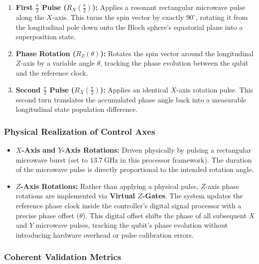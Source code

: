 \documentclass[
]{article}
\providecommand{\tightlist}{%
  \setlength{\itemsep}{0pt}\setlength{\parskip}{0pt}}
\begin{document}
\begin{enumerate}
\def\labelenumi{\arabic{enumi}.}
\tightlist
\item
  \textbf{First \(\frac{\pi}{2}\) Pulse (\(R_X(\frac{\pi}{2})\)):}
  Applies a resonant rectangular microwave pulse along the \(X\)-axis.
  This turns the spin vector by exactly \(90^\circ\), rotating it from
  the longitudinal pole down onto the Bloch sphere's equatorial plane
  into a superposition state.
\item
  \textbf{Phase Rotation (\(R_Z(\theta)\)):} Rotates the spin vector
  around the longitudinal \(Z\)-axis by a variable angle \(\theta\),
  tracking the phase evolution between the qubit and the reference
  clock.
\item
  \textbf{Second \(\frac{\pi}{2}\) Pulse (\(R_X(\frac{\pi}{2})\)):}
  Applies an identical \(X\)-axis rotation pulse. This second turn
  translates the accumulated phase angle back into a measurable
  longitudinal state population difference.
\end{enumerate}

\subsubsection{Physical Realization of Control
Axes}\label{physical-realization-of-control-axes}

\begin{itemize}
\tightlist
\item
  \textbf{\(X\)-Axis and \(Y\)-Axis Rotations:} Driven physically by
  pulsing a rectangular microwave burst (set to \(13.7\ \text{GHz}\) in
  this processor framework). The duration of the microwave pulse is
  directly proportional to the intended rotation angle.
\item
  \textbf{\(Z\)-Axis Rotations:} Rather than applying a physical pulse,
  \(Z\)-axis phase rotations are implemented via \textbf{Virtual
  \(Z\)-Gates}. The system updates the reference phase clock inside the
  controller's digital signal processor with a precise phase offset
  (\(\theta\)). This digital offset shifts the phase of all subsequent
  \(X\) and \(Y\) microwave pulses, tracking the qubit's phase evolution
  without introducing hardware overhead or pulse calibration errors.
\end{itemize}

\subsubsection{Coherent Validation
Metrics}\label{coherent-validation-metrics}
\end{document}
